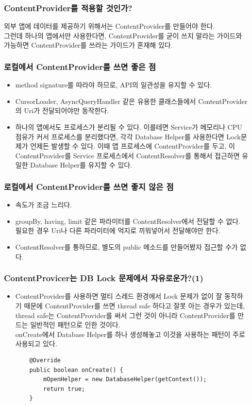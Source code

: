 \documentclass{beamer}
\newcommand\Fontvi{\fontsize{8}{9.6}\selectfont}
\begin{document}
\begin{frame}
\frametitle{ContentProvider를 적용할 것인가?}
외부 앱에 데이터를 제공하기 위해서는 ContentProvider를 만들어야 한다.\\
그런데 하나의 앱에서만 사용한다면, ContentProvider를 굳이 쓰지 말라는 가이드와 가능하면 ContentProvider를 쓰라는 가이드가 혼재해 있다.
\end{frame}

\begin{frame}
\frametitle{로컬에서 ContentProvider를 쓰면 좋은 점}
\begin{itemize}
\item method signature를 따라야 하므로, API의 일관성을 유지할 수 있다.
\item CursorLoader, AsyncQueryHandler 같은 유용한 클래스들에서 ContentProvider의 Uri가 전달되어야만 동작한다.
\item 하나의 앱에서도 프로세스가 분리될 수 있다. 이를테면 Service가 메모리나 CPU 점유가 커서 프로세스를 분리했다면, 각각 Database Helper를 사용한다면 Lock문제가 언제든 발생할 수 있다. 이때 앱 프로세스에 ContentProvider를 두고, 이 ContentProvider를 Service 프로세스에서 ContentResolver를 통해서 접근하면 유일한 Database Helper를 유지할 수 있다.
\end {itemize}
\end{frame}

\begin{frame}
\frametitle{로컬에서 ContentProvider를 쓰면 좋지 않은 점}
\begin{itemize}
\item 속도가 조금 느리다.
\item groupBy, having, limit 같은 파라미터를 ContentResolver에서 전달할 수 없다.  필요한 경우 Uri나 다른 파라미터에 억지로 끼워넣어서 전달해야만 한다. 
\item ContentResolver를 통하므로, 별도의 public 메소드를 만들어봤자 접근할 수가 없다.
\end {itemize}
\end{frame}

\begin{frame}[fragile]
\frametitle{ContentProvicer는 DB Lock 문제에서 자유로운가?(1)}
\begin{itemize}
\item ContentProvider를 사용하면 멀티 스레드 환경에서 Lock 문제가 없이 잘 동작하기 때문에 ContentProvider를 쓰면 thread safe 하다고 잘못 아는 경우가 있는데, thread safe는 ContentProvider를 써서 그런 것이 아니라 ContentProvider를 만드는 일반적인 패턴으로 인한 것이다.\\
onCreate에서 Database Helper를 하나 생성해놓고 이것을 사용하는 패턴이 주로 사용되고 있다.

\Fontvi
\begin{verbatim}
	@Override
	public boolean onCreate() {
	    mOpenHelper = new DatabaseHelper(getContext());
	    return true;
	}
\end{verbatim}
\end {itemize}
\end{frame}
\end{document}
